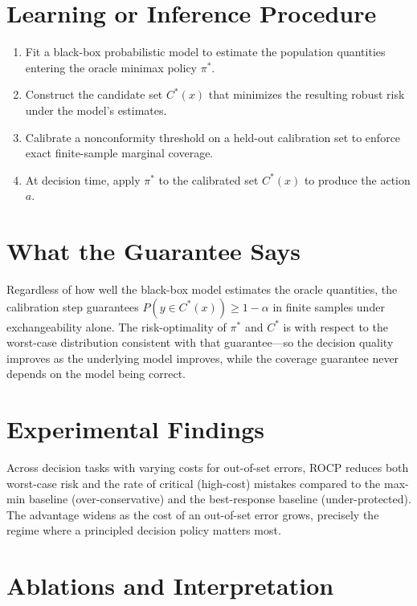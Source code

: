 \documentclass[10pt,twocolumn]{article}
\begin{document}
\section{Learning or Inference Procedure}

\begin{enumerate}[itemsep=2pt,parsep=0pt]
  \item Fit a black-box probabilistic model to estimate the population
    quantities entering the oracle minimax policy $\pi^{\ast}$.
  \item Construct the candidate set $C^{\ast}(x)$ that minimizes the
    resulting robust risk under the model's estimates.
  \item Calibrate a nonconformity threshold on a held-out calibration
    set to enforce exact finite-sample marginal coverage.
  \item At decision time, apply $\pi^{\ast}$ to the calibrated set
    $C^{\ast}(x)$ to produce the action $a$.
\end{enumerate}

\section{What the Guarantee Says}

Regardless of how well the black-box model estimates the oracle
quantities, the calibration step guarantees
$P(y \in C^{\ast}(x)) \ge 1-\alpha$ in finite samples under
exchangeability alone. The risk-optimality of $\pi^{\ast}$ and
$C^{\ast}$ is with respect to the worst-case distribution consistent
with that guarantee---so the decision quality improves as the
underlying model improves, while the coverage guarantee never depends
on the model being correct.

\section{Experimental Findings}

Across decision tasks with varying costs for out-of-set errors, ROCP
reduces both worst-case risk and the rate of critical (high-cost)
mistakes compared to the max-min baseline (over-conservative) and the
best-response baseline (under-protected). The advantage widens as the
cost of an out-of-set error grows, precisely the regime where a
principled decision policy matters most.

\section{Ablations and Interpretation}
\end{document}

